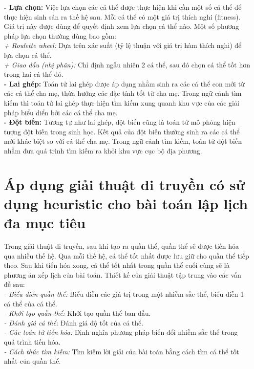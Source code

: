 \documentclass[a4paper,12pt]{article}
\begin{document}
\textbf{- Lựa chọn:} Việc lựa chọn các cá thể được thực hiện khi cần một số cá thể để thực hiện sinh sản ra thế hệ sau. Mỗi cá thể có một giá trị thích nghi (fitness). Giá trị này được dùng để quyết định xem lựa chọn cá thể nào. Một số phương pháp lựa chọn thường dùng bao gồm:\\
\textit{+ Roulette wheel:} Dựa trên xác suất (tỷ lệ thuận với giá trị hàm thích nghi) để lựa chọn cá thể.\\
\textit{+ Giao đấu (nhị phân):} Chỉ định ngẫu nhiên 2 cá thể, sau đó chọn cá thể tốt hơn trong hai cá thể đó.\\
\textbf{- Lai ghép:} Toán tử lai ghép được áp dụng nhằm sinh ra các cá thể con mới từ các cá thể cha mẹ, thừa hưởng các đặc tính tốt từ cha mẹ. Trong ngữ cảnh tìm kiếm thì toán tử lai ghép thực hiện tìm kiếm xung quanh khu vực của các giải pháp biểu diển bởi các cá thể cha mẹ.\\
\textbf{- Đột biến:} Tương tự như lai ghép, đột biến cũng là toán tử mô phỏng hiện tượng đột biến trong sinh học. Kết quả của đột biến thường sinh ra các cá thể mới khác biệt so với cá thể cha mẹ. Trong ngữ cảnh tìm kiếm, toán tử đột biến nhằm đưa quá trình tìm kiếm ra khỏi khu vực cục bộ địa phương.
\section{Áp dụng giải thuật di truyền có sử dụng heuristic cho bài toán lập lịch đa mục tiêu}
Trong giải thuật di truyền, sau khi tạo ra quần thể, quần thể sẽ được tiến hóa qua nhiều thế hệ. Qua mỗi thế hệ, cá thể tốt nhất được lưu giữ cho quần thể tiếp theo. Sau khi tiến hóa xong, cá thể tốt nhất trong quần thể cuối cùng sẽ là phương án xếp lịch của bài toán. Thiết kế của giải thuật tập trung vào các vấn đề sau:\\
\textit{- Biểu diễn quần thể:} Biểu diễn các giá trị trong một nhiễm sắc thể, biểu diễn 1 cá thể của cá thể.\\
\textit{- Khởi tạo quần thể:} Khởi tạo quần thể ban đầu.\\
\textit{- Đánh giá cá thể:} Đánh giá độ tốt của cá thể.\\
\textit{- Các toán tử tiến hóa:} Định nghĩa phương pháp biến đổi nhiễm sắc thể trong quá trình tiến hóa.\\
\textit{- Cách thức tìm kiếm:} Tìm kiếm lời giải của bài toán bằng cách tìm cá thể tốt nhất của quần thể.
\end{document}
